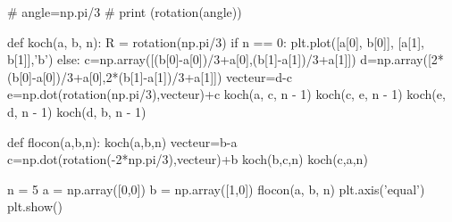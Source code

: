 \documentclass[10pt,fleqn]{article} %
\begin{document}
\begin{multicols}{2}
\begin{corrige}
\begin{python}
# angle=np.pi/3    
# print (rotation(angle))

def koch(a, b, n):
    R = rotation(np.pi/3)
    if n == 0:
        plt.plot([a[0], b[0]], [a[1], b[1]],'b')
    else:
        c=np.array([(b[0]-a[0])/3+a[0],(b[1]-a[1])/3+a[1]])
        d=np.array([2*(b[0]-a[0])/3+a[0],2*(b[1]-a[1])/3+a[1]])
        vecteur=d-c
        e=np.dot(rotation(np.pi/3),vecteur)+c
        koch(a, c, n - 1)
        koch(c, e, n - 1)
        koch(e, d, n - 1)
        koch(d, b, n - 1)
        
def flocon(a,b,n):
    koch(a,b,n)
    vecteur=b-a
    c=np.dot(rotation(-2*np.pi/3),vecteur)+b
    koch(b,c,n)
    koch(c,a,n)

n = 5
a = np.array([0,0])
b = np.array([1,0])
flocon(a, b, n)
plt.axis('equal')
plt.show()
\end{python}
\end{corrige}
\else
\fi

\ifprof
\else
\end{multicols}
\fi
\end{document}
